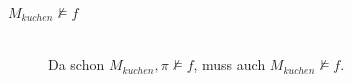 \documentclass[a4paper]{scrartcl}
\begin{document}
\begin{enumerate}
\begin{description}
            \item[$M_{kuchen} \not\models f$] \hfill \\
                Da schon $M_{kuchen}, \pi \not\models f$, muss auch
                $M_{kuchen} \not\models f$.

        \end{description}

\end{enumerate}
\end{document}
